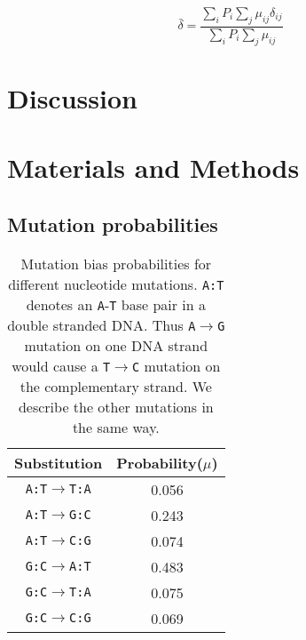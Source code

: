 \documentclass[12pt,a4paper]{article}
\begin{document}
\begin{equation}
\bar{\delta} = \frac{\displaystyle\sum_i P_i \sum_j \mu_{ij}\delta_{ij}}{\displaystyle\sum_i P_i \sum_j \mu_{ij}}
\end{equation}

\section*{Discussion} 


\section*{Materials and Methods}

\subsection{Mutation probabilities}

\begin{table}[H]
\centering
\begin{tabular}{c c}
\toprule
\textbf{Substitution} & Probability($\mu$) \\\midrule
\texttt{A:T}$\to$\texttt{T:A} & 0.056 \\\midrule
\texttt{A:T}$\to$\texttt{G:C} & 0.243 \\\midrule
\texttt{A:T}$\to$\texttt{C:G} & 0.074 \\\midrule
\texttt{G:C}$\to$\texttt{A:T} & 0.483 \\\midrule
\texttt{G:C}$\to$\texttt{T:A} & 0.075 \\\midrule
\texttt{G:C}$\to$\texttt{C:G} & 0.069 \\\bottomrule
\end{tabular}
\caption{Mutation bias probabilities for different nucleotide mutations. \texttt{A:T} denotes an \texttt{A}-\texttt{T} base pair in a double stranded DNA. Thus \texttt{A}$\to$\texttt{G} mutation on one DNA strand would cause a \texttt{T}$\to$\texttt{C} mutation on the complementary strand. We describe the other mutations in the same way.}
\label{mutbias}
\end{table}
\end{document}
